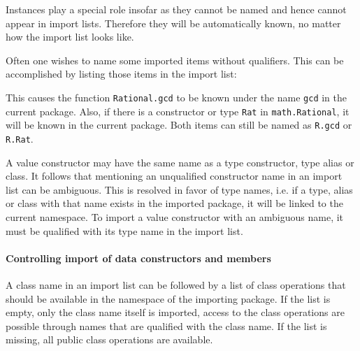 Instances play a special role insofar as they cannot be named and hence cannot appear in import lists. 
Therefore they will be automatically known, no matter how the import list looks like.  

Often one wishes to name some imported items without qualifiers. This
can be accomplished by listing those items in the import list:


This causes the function {\tt Rational.gcd} to be known under the
name {\tt gcd} in the current package. Also, if there is a constructor
or type {\tt Rat} in {\tt math.Rational}, it will be known in the
current package. Both items can still be named as {\tt R.gcd} or {\tt
R.Rat}.

A value constructor may have the same name as a type constructor, type alias or class. 
It follows that mentioning an unqualified constructor name in an import list can be ambiguous. 
This is resolved in favor of type names, i.e. if a type, alias  or class with that name exists in the imported package, 
it will be linked to the current namespace. 
To import a value constructor with an ambiguous name, it must be qualified with its type name in the import list.

\paragraph*{Controlling import of data constructors and members}

A class name in an import list can be followed by a list of class operations that should be available in the namespace of the importing package. If the list is empty, only the class name itself is imported, access to the class operations are possible through names that are qualified with the class name. If the list is missing, all public class operations are available. 

